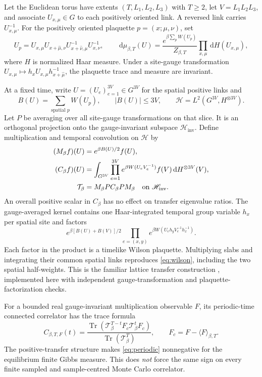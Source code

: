 \documentclass[11pt,a4paper]{article}
\numberwithin{equation}{section}
\newcommand{\Tr}{\operatorname{Tr}}
\newcommand{\dd}{\,\mathrm d}
\begin{document}
Let the Euclidean torus have extents \((T,L_1,L_2,L_3)\)
with \(T\geq2\),
let \(V=L_1L_2L_3\), and associate \(U_{x,\mu}\in G\) to each
positively oriented link. A reversed link carries \(U_{x,\mu}^{-1}\).
For the positively oriented plaquette \(p=(x;\mu,\nu)\), set
\begin{equation}
 U_p=U_{x,\mu}U_{x+\hat\mu,\nu}
       U_{x+\hat\nu,\mu}^{-1}U_{x,\nu}^{-1},
 \qquad
 \dd\mu_{\beta,T}(U)
 =\frac{e^{\beta\sum_pW(U_p)}}{Z_{\beta,T}}
       \prod_{x,\mu}\dd H(U_{x,\mu}),             \label{eq:wilson}
\end{equation}
where \(H\) is normalized Haar measure. Under a site-gauge
transformation \(U_{x,\mu}\mapsto
h_xU_{x,\mu}h_{x+\hat\mu}^{-1}\), the plaquette trace and
measure are invariant.

At a fixed time, write \(U=(U_e)_{e=1}^{3V}\in G^{3V}\) for the
spatial positive links and
\begin{equation}
 B(U)=\sum_{\text{spatial }p}W(U_p),\qquad
 |B(U)|\leq3V,\qquad
 \mathscr H=L^2(G^{3V},H^{\otimes3V}).
\end{equation}
Let \(P\) be averaging over all site-gauge transformations on that
slice. It is an orthogonal projection onto the gauge-invariant
subspace \(\mathscr H_{\mathrm{inv}}\).
Define multiplication and temporal convolution on \(\mathscr H\) by
\begin{align}
 (M_\beta f)(U)&=e^{\beta B(U)/2}f(U),\nonumber\\
 (C_\beta f)(U)&=\int_{G^{3V}}
       \prod_{e=1}^{3V}e^{\beta W(U_eV_e^{-1})}
       f(V)\dd H^{\otimes3V}(V),                 \label{eq:transfer}\\
 \mathcal T_\beta&=M_\beta P C_\beta P M_\beta
      \quad\hbox{on }\mathscr H_{\mathrm{inv}}.\nonumber
\end{align}
An overall positive scalar in \(C_\beta\) has no effect on
transfer eigenvalue ratios. The gauge-averaged kernel contains
one Haar-integrated temporal group variable \(h_x\) per spatial
site and factors
\[
 e^{\beta[B(U)+B(V)]/2}
 \prod_{e=(x,y)}
 e^{\beta W(U_eh_yV_e^{-1}h_x^{-1})}.
\]
Each factor in the product is a timelike Wilson plaquette.
Multiplying slabs and integrating their common spatial links
reproduces \eqref{eq:wilson}, including the two spatial half-weights.
This is the familiar lattice transfer construction
\cite{OsterwalderSeiler}, implemented here with independent
gauge-transformation and plaquette-factorization checks.

For a bounded real gauge-invariant multiplication observable \(F\), its
periodic-time connected correlator has the trace formula
\begin{equation}
 C_{\beta,T,F}(t)=
  \frac{\Tr(\mathcal T_\beta^{T-t}F_c
                   \mathcal T_\beta^tF_c)}
       {\Tr(\mathcal T_\beta^T)},\qquad
 F_c=F-\langle F\rangle_{\beta,T}.               \label{eq:periodic}
\end{equation}
The positive-transfer structure makes \eqref{eq:periodic}
nonnegative for the equilibrium finite Gibbs measure. This does
\emph{not} force the same sign on every finite sampled and
sample-centred Monte Carlo correlator.
\end{document}
